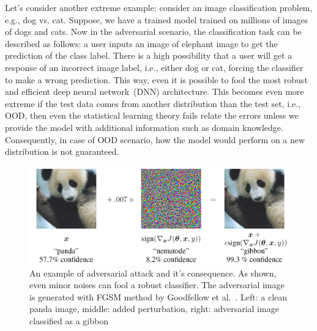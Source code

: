 \hspace*{3.5mm} Let's consider another extreme example: consider an image classification problem, e.g., dog vs. cat. Suppose, we have a trained model trained on millions of images of dogs and cats. Now in the adversarial scenario, the classification task can be described as follows: a user inputs an image of elephant image to get the prediction of the class label. There is a high possibility that a user will get a response of an incorrect image label, i.e., either dog or cat, forcing the classifier to make a wrong prediction. This way, even it is possible to fool the most robust and efficient deep neural network~(DNN) architecture. This becomes even more extreme if the test data comes from another distribution than the test set, i.e., OOD, then even the statistical learning theory fails relate the errors unless we provide the model with additional information such as domain knowledge. Consequently, in case of OOD scenario, how the model would perform on a new distribution is not guaranteed. 

\begin{figure}
    \centering
    \includegraphics[scale=0.8]{images/panda_adversary.png}
    \caption[An example of adversarial attack and it's consequence]{An example of adversarial attack and it's consequence. As shown, even minor noises can fool a robust classifier. The adversarial image is generated with FGSM method by Goodfellow et al.~\cite{goodfellow2014explaining}. Left: a clean panda image, middle: added perturbation, right: adversarial image classified as a gibbon}
    \label{fig:fgsm_example}
    \vspace{-4mm}
\end{figure}


